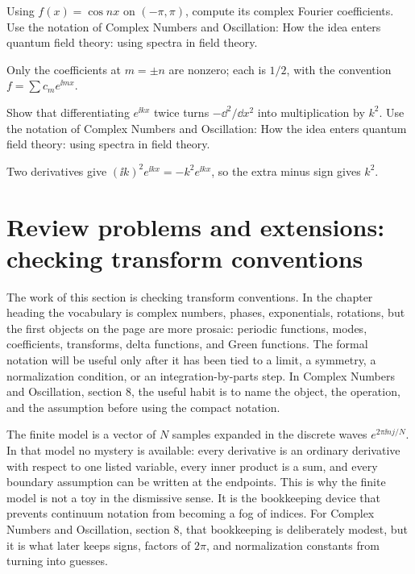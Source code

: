 \begin{exercise}
Using \(f(x)=\cos nx\) on \((-\pi,\pi)\), compute its complex Fourier coefficients.  Use the notation of Complex Numbers and Oscillation: How the idea enters quantum field theory: using spectra in field theory.
\begin{answer}
Only the coefficients at \(m=\pm n\) are nonzero; each is \(1/2\), with the convention \(f=\sum c_me^{\ii mx}\).
\end{answer}
\end{exercise}

\begin{exercise}
Show that differentiating \(e^{\ii kx}\) twice turns \(-\dd^2/\dd x^2\) into multiplication by \(k^2\).  Use the notation of Complex Numbers and Oscillation: How the idea enters quantum field theory: using spectra in field theory.
\begin{answer}
Two derivatives give \((\ii k)^2e^{\ii kx}=-k^2e^{\ii kx}\), so the extra minus sign gives \(k^2\).
\end{answer}
\end{exercise}



\section{Review problems and extensions: checking transform conventions}

The work of this section is checking transform conventions.  In the chapter heading the vocabulary is complex numbers, phases, exponentials, rotations, but the first objects on the page are more prosaic: periodic functions, modes, coefficients, transforms, delta functions, and Green functions.  The formal notation will be useful only after it has been tied to a limit, a symmetry, a normalization condition, or an integration-by-parts step.  In Complex Numbers and Oscillation, section 8, the useful habit is to name the object, the operation, and the assumption before using the compact notation.

The finite model is a vector of \(N\) samples expanded in the discrete waves \(e^{2\pi \ii nj/N}\).  In that model no mystery is available: every derivative is an ordinary derivative with respect to one listed variable, every inner product is a sum, and every boundary assumption can be written at the endpoints.  This is why the finite model is not a toy in the dismissive sense.  It is the bookkeeping device that prevents continuum notation from becoming a fog of indices.  For Complex Numbers and Oscillation, section 8, that bookkeeping is deliberately modest, but it is what later keeps signs, factors of \(2\pi\), and normalization constants from turning into guesses.


